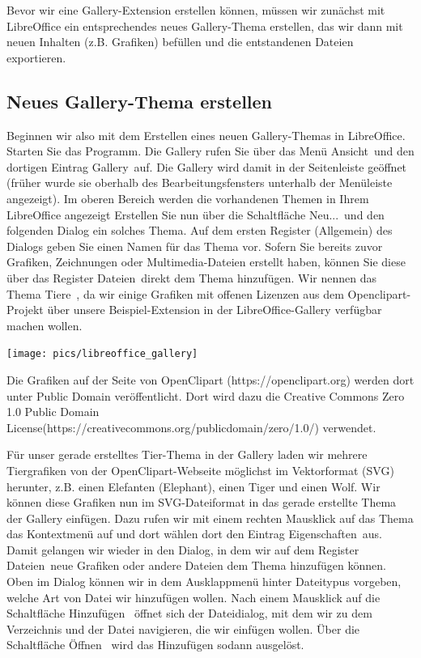 \documentclass[12pt,a4paper,titlepage]{book}
\begin{document}
Bevor wir eine Gallery-Extension erstellen können, müssen wir zunächst mit LibreOffice ein entsprechendes neues Gallery-Thema erstellen, das wir dann mit neuen Inhalten (z.B. Grafiken) befüllen und die entstandenen Dateien exportieren.

\subsection{Neues Gallery-Thema erstellen}

Beginnen wir also mit dem Erstellen eines neuen Gallery-Themas in LibreOffice. Starten Sie das Programm. Die Gallery rufen Sie über das Menü \glqq Ansicht\grqq~und den dortigen Eintrag \glqq Gallery\grqq~auf. Die Gallery wird damit in der Seitenleiste geöffnet (früher wurde sie oberhalb des Bearbeitungsfensters unterhalb der Menüleiste angezeigt). Im oberen Bereich werden die vorhandenen Themen in Ihrem LibreOffice angezeigt Erstellen Sie nun über die Schaltfläche \glqq Neu...\grqq~und den folgenden Dialog ein solches Thema. Auf dem ersten Register (\glqq Allgemein\grqq) des Dialogs geben Sie einen Namen für das Thema vor. Sofern Sie bereits zuvor Grafiken, Zeichnungen oder Multimedia-Dateien erstellt haben, können Sie diese über das Register \glqq Dateien\grqq~direkt dem Thema hinzufügen. Wir nennen das Thema \glqq Tiere\grqq~, da wir einige Grafiken mit offenen Lizenzen aus dem Openclipart-Projekt über unsere Beispiel-Extension in der LibreOffice-Gallery verfügbar machen wollen.

\begin{center}
	\captionsetup{type=figure}
	\texttt{[image: pics/libreoffice\_gallery]}
	\label{fig:libreoffice_gallery}
\end{center}


Die Grafiken auf der Seite von OpenClipart (https://openclipart.org) werden dort unter Public Domain veröffentlicht. Dort wird dazu die Creative Commons Zero 1.0 Public Domain License\linebreak (https://creativecommons.org/publicdomain/zero/1.0/) verwendet.

Für unser gerade erstelltes Tier-Thema  in der Gallery laden wir mehrere Tiergrafiken von der OpenClipart-Webseite möglichst im Vektorformat (SVG) herunter, z.B. einen Elefanten (Elephant), einen Tiger und einen Wolf. Wir können diese Grafiken nun im SVG-Dateiformat in das gerade erstellte Thema der Gallery einfügen. Dazu rufen wir mit einem rechten Mausklick auf das Thema das Kontextmenü auf und dort wählen dort den Eintrag \glqq Eigenschaften\grqq~aus. Damit gelangen wir wieder in den Dialog, in dem wir auf dem Register \glqq Dateien\grqq~neue Grafiken oder andere Dateien dem Thema hinzufügen können. Oben im Dialog können wir in dem Ausklappmenü hinter Dateitypus vorgeben, welche Art von Datei wir hinzufügen wollen. Nach einem Mausklick auf die Schaltfläche \glqq Hinzufügen\grqq~ öffnet sich der Dateidialog, mit dem wir zu dem Verzeichnis und der Datei navigieren, die wir einfügen wollen. Über die Schaltfläche \glqq Öffnen\grqq~ wird das Hinzufügen sodann ausgelöst.
\end{document}
